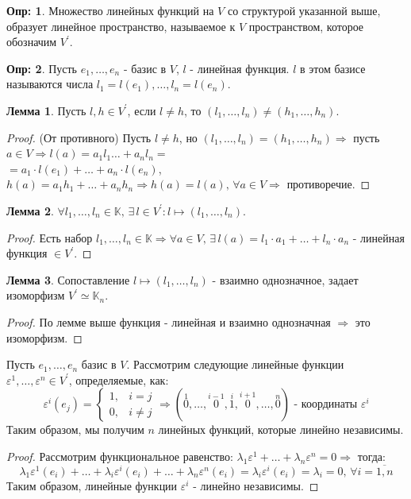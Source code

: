 \documentclass[12pt]{article}
\newcommand{\VE}{\varepsilon}
\theoremstyle{definition}
\newtheorem{defn}{Опр:}
\newtheorem{lemma}{Лемма}
\begin{document}
\begin{defn}
	Множество линейных функций на $V$ со структурой указанной выше, образует линейное пространство, называемое  к $V$ пространством, которое обозначим $V^\prime$.
\end{defn}
\begin{defn}
	Пусть $e_1,\dotsc, e_n$ - базис в $V$, $l$ - линейная функция.  $l$ в этом базисе называются числа $l_1 = l(e_1), \dotsc, l_n = l(e_n)$.
\end{defn}
\begin{lemma}
	Пусть $l,h \in V^\prime$, если $l \neq h$, то $(l_1,\dotsc, l_n) \neq (h_1,\dotsc, h_n)$.
\end{lemma}
\begin{proof}
	(От противного) Пусть $l \neq h$, но $(l_1,\dotsc, l_n) = (h_1, \dotsc, h_n) \Rightarrow$ пусть $a \in V \Rightarrow l(a) = a_1 l_1 \dotsc + a_n l_n = $\\
	$= a_1{\cdot}l(e_1) + \dotsc + a_n {\cdot}l(e_n)$, $h(a) = a_1 h_1 + \dotsc + a_n h_n \Rightarrow h(a) = l(a), \, \forall a \in V \Rightarrow$ противоречие.
\end{proof}

\begin{lemma}
	$\forall l_1, \dotsc, l_n \in \mathbb{K}, \, \exists \, l \in V^\prime \colon l \mapsto (l_1,\dotsc, l_n)$.
\end{lemma}
\begin{proof}
	Есть набор $l_1,\dotsc, l_n \in \mathbb{K} \Rightarrow \forall a \in V, \, \exists \, l(a) = l_1{\cdot}a_1 + \dotsc + l_n{\cdot}a_n$ - линейная функция $\in V^\prime$.
\end{proof}

\begin{lemma}
	Сопоставление $l \mapsto (l_1,\dotsc, l_n)$ - взаимно однозначное, задает изоморфизм $V^\prime \simeq \mathbb{K}_n$.
\end{lemma}
\begin{proof}
	По лемме выше функция - линейная и взаимно однозначная $\Rightarrow$ это изоморфизм.
\end{proof}

Пусть $e_1, \dotsc, e_n$ базис в $V$. Рассмотрим следующие линейные функции $\VE^1, \dotsc, \VE^n \in V^\prime$, определяемые, как:
$$
	\VE^i(e_j) = \begin{cases} 1, & i = j\\ 0, & i \neq j \end{cases} \Rightarrow (\overset{1}{0}, \dotsc, \overset{i-1}{0}, \overset{i}{1}, \overset{i+1}{0},\dotsc, \overset{n}{0})\text{ - координаты }\VE^i
$$
Таким образом, мы получим $n$ линейных функций, которые линейно независимы.
\begin{proof}
	Рассмотрим функциональное равенство: $\lambda_1 \VE^1 + \dotsc + \lambda_n \VE^n = 0 \Rightarrow$ тогда:
	$$
		\lambda_1 \VE^1(e_i) + \dotsc + \lambda_i \VE^i(e_i) + \dotsc + \lambda_n \VE^n(e_i) = \lambda_i \VE^i(e_i) = \lambda_i = 0, \, \forall i = \overline{1,n}
	$$
	Таким образом, линейные функции $\VE^i$ - линейно независимы.
\end{proof}
\end{document}
